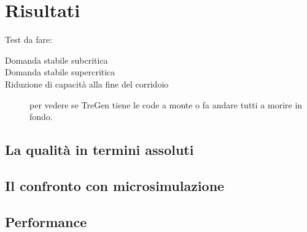 
\chapter{Risultati}
Test da fare:
\begin{description}
\item[Domanda stabile subcritica]
\item[Domanda stabile supercritica]
\item[Riduzione di capacità alla fine del corridoio] per vedere se TreGen tiene le code a monte o fa andare tutti a morire in fondo.
\end{description}



\section{La qualità in termini assoluti}


\section{Il confronto con microsimulazione}


\section{Performance}